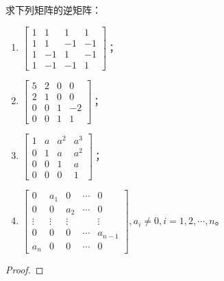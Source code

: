 \begin{problem}\label{problem-2.39}
求下列矩阵的逆矩阵：
\begin{enumerate}
    \item \(\begin{bmatrix}
              1 & 1  & 1  & 1  \\
              1 & 1  & -1 & -1 \\
              1 & -1 & 1  & -1 \\
              1 & -1 & -1 & 1
          \end{bmatrix}\)；
    \item \(\begin{bmatrix}
              5 & 2 & 0 & 0  \\
              2 & 1 & 0 & 0  \\
              0 & 0 & 1 & -2 \\
              0 & 0 & 1 & 1
          \end{bmatrix}\)；
    \item \(\begin{bmatrix}
              1 & a & a^2 & a^3 \\
              0 & 1 & a   & a^2 \\
              0 & 0 & 1   & a   \\
              0 & 0 & 0   & 1
          \end{bmatrix}\)；
    \item \(\begin{bmatrix}
              0      & a_1    & 0      & \cdots & 0       \\
              0      & 0      & a_2    & \cdots & 0       \\
              \vdots & \vdots & \vdots &        & \vdots  \\
              0      & 0      & 0      & \cdots & a_{n-1} \\
              a_n    & 0      & 0      & \cdots & 0
          \end{bmatrix},a_i\neq0,i=1,2,\cdots,n\)。
\end{enumerate}
\end{problem}
\begin{proof}
\end{proof}


